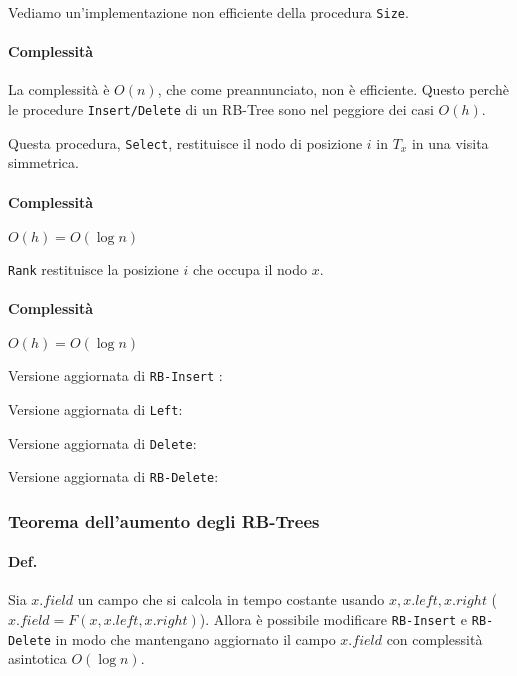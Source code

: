 \par
Vediamo un'implementazione non efficiente della procedura \texttt{Size}.

 

\paragraph{Complessità} La complessità è $O(n)$, che come preannunciato, non è efficiente.
Questo perchè le procedure \texttt{Insert/Delete} di un RB-Tree sono nel peggiore dei casi $O(h)$.

\bigskip Questa procedura, \texttt{Select}, restituisce il nodo di posizione $i$
in $T_x$ in una visita simmetrica.

 

\paragraph{Complessità} $O(h) = O(\log n)$

\texttt{Rank} restituisce la posizione $i$ che occupa il nodo $x$.



\paragraph{Complessità} $O(h) = O(\log n)$

\bigskip Versione aggiornata di \texttt{RB-Insert} :



Versione aggiornata di \texttt{Left}:



Versione aggiornata di \texttt{Delete}:



Versione aggiornata di \texttt{RB-Delete}:




\subsubsection{Teorema dell'aumento degli RB-Trees}

\paragraph{Def.} Sia $x.field$ un campo che si calcola in tempo costante
usando $x, x.left, x.right$ ($x.field = F(x, x.left, x.right)$).
Allora è possibile modificare \texttt{RB-Insert} e \texttt{RB-Delete}
in modo che mantengano aggiornato il campo $x.field$ con complessità
asintotica $O(\log n)$.

